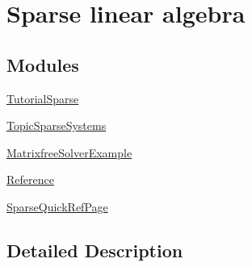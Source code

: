 \hypertarget{group___sparse__chapter}{}\section{Sparse linear algebra}
\label{group___sparse__chapter}
\subsection*{Modules}
\begin{DoxyCompactItemize}
\item 
\hyperlink{group___tutorial_sparse}{Tutorial\+Sparse}
\item 
\hyperlink{group___topic_sparse_systems}{Topic\+Sparse\+Systems}
\item 
\hyperlink{group___matrixfree_solver_example}{Matrixfree\+Solver\+Example}
\item 
\hyperlink{group___sparse___reference}{Reference}
\item 
\hyperlink{group___sparse_quick_ref_page}{Sparse\+Quick\+Ref\+Page}
\end{DoxyCompactItemize}


\subsection{Detailed Description}
